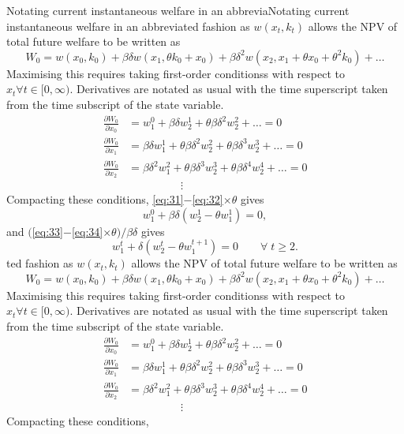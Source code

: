 \documentclass{amsart}
\newcommand{\del}[2]{\frac{\partial #1}{\partial #2}}
\begin{document}
Notating current instantaneous welfare in an abbreviaNotating current instantaneous welfare in an abbreviated fashion as
$w(x_t,k_t)$ allows the NPV of total future welfare to be written as
\begin{equation}
  \label{eq:30} W_0 = w(x_0,k_0) + \beta\delta w(x_1,\theta k_0+x_0) +
\beta\delta^2 w(x_2,x_1+\theta x_0+\theta^2 k_0) + \ldots
\end{equation} Maximising this requires taking first-order conditionss
with respect to $x_t \forall t\in [0,\infty)$. Derivatives are notated
as usual with the time superscript taken from the time subscript of
the state variable.
\begin{align}
  \label{eq:31} \del{W_0}{x_0} &= w_1^0 + \beta\delta w_2^1 +
\theta\beta\delta^2 w_2^2 + \ldots = 0 \\ \label{eq:32} \del{W_0}{x_1}
&=\beta\delta w_1^1 + \theta\beta\delta^2 w_2^2 + \theta\beta\delta^3
w_2^3 + \ldots = 0 \\ \label{eq:33} \del{W_0}{x_2} &=\beta\delta^2
w_1^2 + \theta\beta\delta^3 w_2^3 + \theta\beta\delta^4 w_2^4 + \ldots
= 0 \\ &\hspace{2cm}\vdots
\end{align} Compacting these conditions,
\eqref{eq:31}$-$\eqref{eq:32}$\times\theta$ gives
\begin{equation}
  \label{eq:34} w^0_1 + \beta\delta \left(w^1_2 - \theta w^1_1 \right)
= 0,
\end{equation} and $($\eqref{eq:33}$-$\eqref{eq:34}$\times\theta ) /
\beta\delta$ gives
\begin{equation}
  \label{eq:35} w^t_1 + \delta \left(w^t_2 - \theta w^{t+1}_1 \right)
= 0 \qquad \forall\; t \geq 2.
\end{equation}
ted fashion as
$w(x_t,k_t)$ allows the NPV of total future welfare to be written as
\begin{equation}
  \label{eq:12} W_0 = w(x_0,k_0) + \beta\delta w(x_1,\theta k_0+x_0) +
\beta\delta^2 w(x_2,x_1+\theta x_0+\theta^2 k_0) + \ldots
\end{equation} Maximising this requires taking first-order conditionss
with respect to $x_t \forall t\in [0,\infty)$. Derivatives are notated
as usual with the time superscript taken from the time subscript of
the state variable.
\begin{align}
  \label{eq:13} \del{W_0}{x_0} &= w_1^0 + \beta\delta w_2^1 +
\theta\beta\delta^2 w_2^2 + \ldots = 0 \\ \label{eq:14} \del{W_0}{x_1}
&=\beta\delta w_1^1 + \theta\beta\delta^2 w_2^2 + \theta\beta\delta^3
w_2^3 + \ldots = 0 \\ \label{eq:15} \del{W_0}{x_2} &=\beta\delta^2
w_1^2 + \theta\beta\delta^3 w_2^3 + \theta\beta\delta^4 w_2^4 + \ldots
= 0 \\ &\hspace{2cm}\vdots
\end{align} Compacting these conditions,
\end{document}

